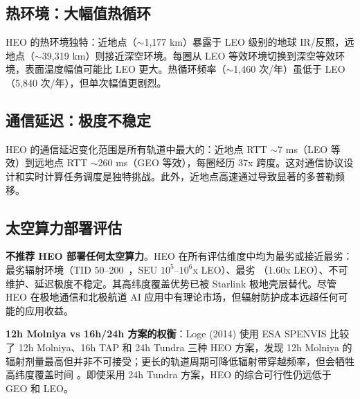 \subsection{热环境：大幅值热循环}

HEO 的热环境独特：近地点（$\sim$1,177 km）暴露于 LEO 级别的地球 IR/反照，远地点（$\sim$39,319 km）则接近深空环境。每圈从 LEO 等效环境切换到深空等效环境，表面温度幅值可能比 LEO 更大。热循环频率（$\sim$1,460 次/年）虽低于 LEO（5,840 次/年），但单次幅值更剧烈。

\subsection{通信延迟：极度不稳定}

HEO 的通信延迟变化范围是所有轨道中最大的：近地点 RTT $\sim$7 ms（LEO 等效）到远地点 RTT $\sim$260 ms（GEO 等效），每圈经历 37x 跨度。这对通信协议设计和实时计算任务调度是独特挑战。此外，近地点高速通过导致显著的多普勒频移。

\subsection{太空算力部署评估}

\textbf{不推荐 HEO 部署任何太空算力}。HEO 在所有评估维度中均为最劣或接近最劣：最劣辐射环境（TID 50--200~\kradyr，SEU $10^{5}$--$10^{6}$x LEO）、最劣 \deltav（1.60x LEO）、不可维护、延迟极度不稳定。其高纬度覆盖优势已被 Starlink 极地壳层替代。尽管 HEO 在极地通信和北极航道 AI 应用中有理论市场，但辐射防护成本远超任何可能的应用收益。

\textbf{12h Molniya vs 16h/24h 方案的权衡}：Loge (2014) 使用 ESA SPENVIS 比较了 12h Molniya、16h TAP 和 24h Tundra 三种 HEO 方案，发现 12h Molniya 的辐射剂量最高但并非不可接受；更长的轨道周期可降低辐射带穿越频率，但会牺牲高纬度覆盖时间 \cite{loge_heo_radiation_2014}。即使采用 24h Tundra 方案，HEO 的综合可行性仍远低于 GEO 和 LEO。
